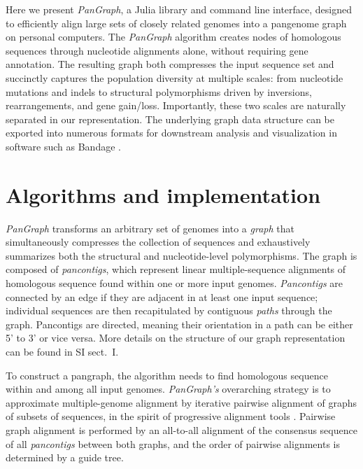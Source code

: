 \documentclass[aps,rmp,preprint,superscriptaddress,10pt,linenumbers]{revtex4-1}
\newcommand{\SIgraph}{I}
\begin{document}
Here we present \emph{PanGraph}, a Julia \cite{bezanson2017julia} library and command line interface, designed to efficiently align large sets of closely related genomes into a pangenome graph on personal computers. The \emph{PanGraph} algorithm creates nodes of homologous sequences through nucleotide alignments alone, without requiring gene annotation.
The resulting graph both compresses the input sequence set and succinctly captures the population diversity at multiple scales: from nucleotide mutations and indels to structural polymorphisms driven by inversions, rearrangements, and gene gain/loss. Importantly, these two scales are naturally separated in our representation.
The underlying graph data structure can be exported into numerous formats for downstream analysis and visualization in software such as Bandage \cite{wick2015bandage}.

\section{Algorithms and implementation}
\emph{PanGraph} transforms an arbitrary set of genomes into a \emph{graph} that simultaneously compresses the collection of sequences and exhaustively summarizes both the structural and nucleotide-level polymorphisms.
The graph is composed of \emph{pancontigs}, which represent linear multiple-sequence alignments of homologous sequence found within one or more input genomes.
\emph{Pancontigs} are connected by an edge if they are adjacent in at least one input sequence; individual sequences are then recapitulated by contiguous \emph{paths} through the graph.
Pancontigs are directed, meaning their orientation in a path can be either 5' to 3' or vice versa.
More details on the structure of our graph representation can be found in SI sect.~\SIgraph{}.

To construct a pangraph, the algorithm needs to find homologous sequence within and among all input genomes.
\emph{PanGraph's} overarching strategy is to approximate multiple-genome alignment by iterative pairwise alignment of graphs of subsets of sequences, in the spirit of progressive alignment tools \cite{feng1987progressive,darling2010progressivemauve,armstrong2020progressive}.
Pairwise graph alignment is performed by an all-to-all alignment of the consensus sequence of all \emph{pancontigs} between both graphs, and the order of pairwise alignments is determined by a guide tree.
\end{document}
